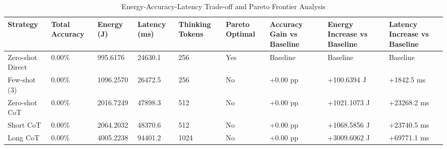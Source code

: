 \begin{table}
\caption{Energy-Accuracy-Latency Trade-off and Pareto Frontier Analysis}
\label{tab:tradeoff_comparison}
\begin{tabular}{lllllllll}
\toprule
Strategy & Total Accuracy & Energy (J) & Latency (ms) & Thinking Tokens & Pareto Optimal & Accuracy Gain vs Baseline & Energy Increase vs Baseline & Latency Increase vs Baseline \\
\midrule
Zero-shot Direct & 0.00\% & 995.6176 & 24630.1 & 256 & Yes & Baseline & Baseline & Baseline \\
Few-shot (3) & 0.00\% & 1096.2570 & 26472.5 & 256 & No & +0.00 pp & +100.6394 J & +1842.5 ms \\
Zero-shot CoT & 0.00\% & 2016.7249 & 47898.3 & 512 & No & +0.00 pp & +1021.1073 J & +23268.2 ms \\
Short CoT & 0.00\% & 2064.2032 & 48370.6 & 512 & No & +0.00 pp & +1068.5856 J & +23740.5 ms \\
Long CoT & 0.00\% & 4005.2238 & 94401.2 & 1024 & No & +0.00 pp & +3009.6062 J & +69771.1 ms \\
\bottomrule
\end{tabular}
\end{table}
